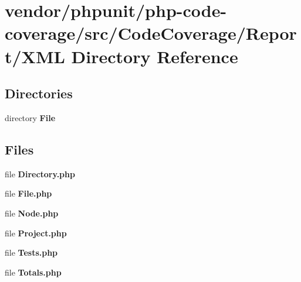 \section{vendor/phpunit/php-\/code-\/coverage/src/\+Code\+Coverage/\+Report/\+X\+M\+L Directory Reference}
\label{dir_a48559dc64fe0f56da916f283043a080}
\subsection*{Directories}
\begin{DoxyCompactItemize}
\item 
directory {\bf File}
\end{DoxyCompactItemize}
\subsection*{Files}
\begin{DoxyCompactItemize}
\item 
file {\bf Directory.\+php}
\item 
file {\bf File.\+php}
\item 
file {\bf Node.\+php}
\item 
file {\bf Project.\+php}
\item 
file {\bf Tests.\+php}
\item 
file {\bf Totals.\+php}
\end{DoxyCompactItemize}
